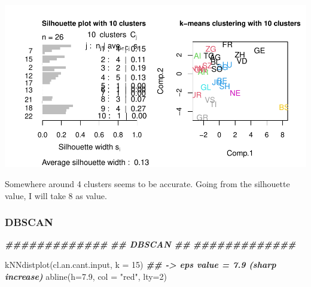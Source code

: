 \documentclass[
]{article}
\newenvironment{Shaded}{\begin{snugshade}}{\end{snugshade}}
\newcommand{\AttributeTok}[1]{\textcolor[rgb]{0.77,0.63,0.00}{#1}}
\newcommand{\CommentTok}[1]{\textcolor[rgb]{0.56,0.35,0.01}{\textit{#1}}}
\newcommand{\DecValTok}[1]{\textcolor[rgb]{0.00,0.00,0.81}{#1}}
\newcommand{\DocumentationTok}[1]{\textcolor[rgb]{0.56,0.35,0.01}{\textbf{\textit{#1}}}}
\newcommand{\FloatTok}[1]{\textcolor[rgb]{0.00,0.00,0.81}{#1}}
\newcommand{\FunctionTok}[1]{\textcolor[rgb]{0.00,0.00,0.00}{#1}}
\newcommand{\NormalTok}[1]{#1}
\newcommand{\OtherTok}[1]{\textcolor[rgb]{0.56,0.35,0.01}{#1}}
\newcommand{\SpecialCharTok}[1]{\textcolor[rgb]{0.00,0.00,0.00}{#1}}
\newcommand{\StringTok}[1]{\textcolor[rgb]{0.31,0.60,0.02}{#1}}
\begin{document}
\includegraphics{Influence_factors_files/figure-latex/3.20_kmeans_cant-10.pdf}

\begin{Shaded}
\end{Shaded}

Somewhere around 4 clusters seems to be accurate. Going from the
silhouette value, I will take 8 as value.

\hypertarget{dbscan-1}{%
\subsubsection{DBSCAN}\label{dbscan-1}}

\begin{Shaded}
\begin{Highlighting}[]
\DocumentationTok{\#\#\#\#\#\#\#\#\#\#\#\#\#}
\DocumentationTok{\#\# DBSCAN  \#\#}
\DocumentationTok{\#\#\#\#\#\#\#\#\#\#\#\#\#}

\FunctionTok{kNNdistplot}\NormalTok{(cl.an.cant.input, }\AttributeTok{k =} \DecValTok{15}\NormalTok{) }\DocumentationTok{\#\# {-}\textgreater{} eps value = 7.9 (sharp increase)}
\FunctionTok{abline}\NormalTok{(}\AttributeTok{h=}\FloatTok{7.9}\NormalTok{, }\AttributeTok{col =} \StringTok{"red"}\NormalTok{, }\AttributeTok{lty=}\DecValTok{2}\NormalTok{)}
\end{Highlighting}
\end{Shaded}
\end{document}

